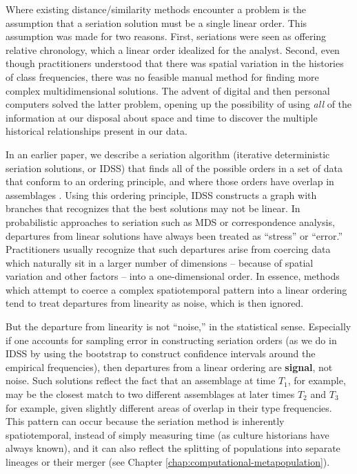 Where existing distance/similarity methods encounter a problem is the
assumption that a seriation solution must be a single linear order. This 
assumption was made for two reasons.  First, seriations were seen as offering relative 
chronology, which a linear order idealized for the analyst.  Second, even though
practitioners understood that there was spatial variation in the histories of class frequencies, 
there was no feasible manual method for finding more complex multidimensional solutions.  
The advent of digital and then personal computers solved the latter problem, opening
up the possibility of using \emph{all} of the information at our disposal about space and time
to discover the multiple historical relationships present in our data.

In
an earlier paper, we describe a seriation algorithm (iterative
deterministic seriation solutions, or IDSS) that finds all of the
possible orders in a set of data that conform to an ordering principle,
and where those orders have overlap in assemblages
\citep{lipomadsendunnell2015}.  Using this ordering principle, IDSS
constructs a graph with branches that recognizes that the best solutions
may not be linear. In probabilistic approaches to seriation such as MDS
or correspondence analysis, departures from linear solutions have always
been treated as ``stress'' or ``error.'' Practitioners usually recognize
that such departures arise from coercing data which naturally sit in a
larger number of dimensions -- because of spatial variation and other
factors -- into a one-dimensional order. In essence, methods which
attempt to coerce a complex spatiotemporal pattern into a linear
ordering tend to treat departures from linearity as noise, which is then
ignored.

But the departure from linearity is not ``noise,'' in the statistical
sense. Especially if one accounts for sampling error in constructing
seriation orders (as we do in IDSS by using the bootstrap to construct
confidence intervals around the empirical frequencies), then departures
from a linear ordering are \textbf{signal}, not noise. Such solutions
reflect the fact that an assemblage at time \(T_1\), for example, may be
the closest match to two different assemblages at later times \(T_2\)
and \(T_3\) for example, given slightly different areas of overlap in
their type frequencies. This pattern can occur because the seriation
method is inherently spatiotemporal, instead of simply measuring time
(as culture historians have always known), and it can also reflect the
splitting of populations into separate lineages or their merger (see Chapter \ref{chap:computational-metapopulation}).

